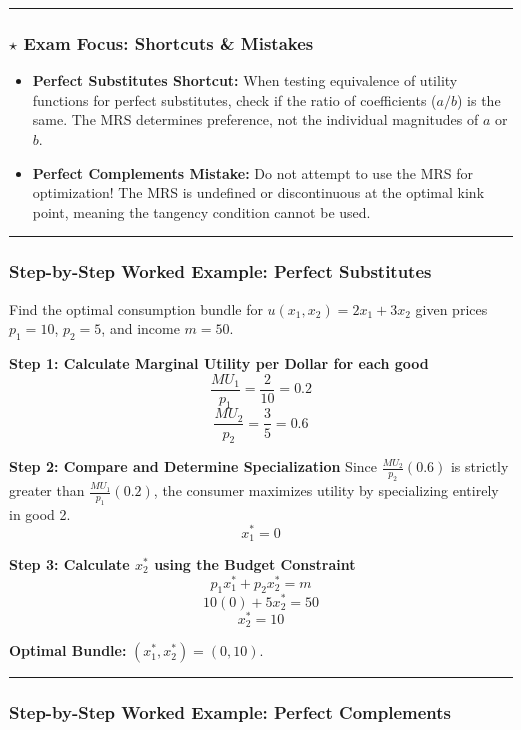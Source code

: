 \documentclass{article}
\begin{document}
\medskip\noindent\rule{\linewidth}{0.4pt}\medskip

\subsubsection*{$\star$ Exam Focus: Shortcuts \& Mistakes}
\begin{itemize}
    \item \textbf{Perfect Substitutes Shortcut:} When testing equivalence of utility functions for perfect substitutes, check if the ratio of coefficients ($a/b$) is the same. The MRS determines preference, not the individual magnitudes of $a$ or $b$.
    \item \textbf{Perfect Complements Mistake:} Do not attempt to use the MRS for optimization! The MRS is undefined or discontinuous at the optimal kink point, meaning the tangency condition cannot be used.
\end{itemize}

\medskip\noindent\rule{\linewidth}{0.4pt}\medskip

\subsubsection*{Step-by-Step Worked Example: Perfect Substitutes}

Find the optimal consumption bundle for $u(x_1, x_2) = 2x_1 + 3x_2$ given prices $p_1=10$, $p_2=5$, and income $m=50$.

\textbf{Step 1: Calculate Marginal Utility per Dollar for each good}
\[ \frac{MU_1}{p_1} = \frac{2}{10} = 0.2 \]
\[ \frac{MU_2}{p_2} = \frac{3}{5} = 0.6 \]

\textbf{Step 2: Compare and Determine Specialization}
Since $\frac{MU_2}{p_2} (0.6)$ is strictly greater than $\frac{MU_1}{p_1} (0.2)$, the consumer maximizes utility by specializing entirely in good 2.
\[ x_1^* = 0 \]

\textbf{Step 3: Calculate $x_2^*$ using the Budget Constraint}
\[ p_1 x_1^* + p_2 x_2^* = m \]
\[ 10(0) + 5x_2^* = 50 \]
\[ x_2^* = 10 \]

\textbf{Optimal Bundle:} $(x_1^*, x_2^*) = (0, 10)$.

\medskip\noindent\rule{\linewidth}{0.4pt}\medskip

\subsubsection*{Step-by-Step Worked Example: Perfect Complements}
\end{document}
